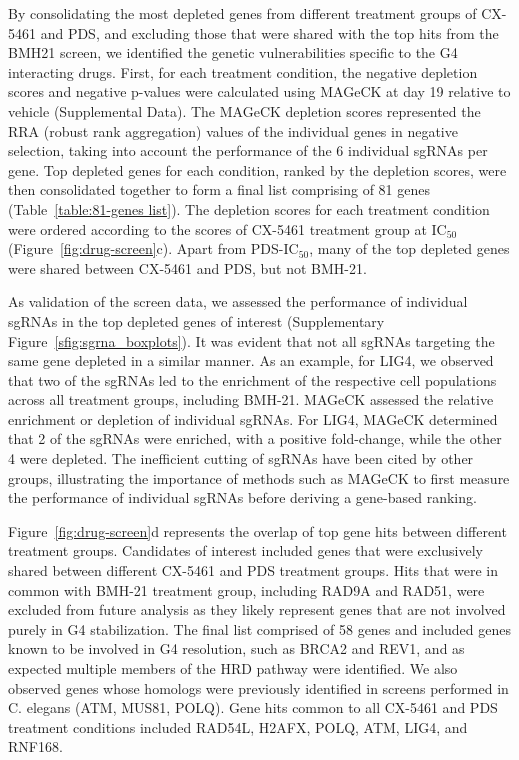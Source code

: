 By consolidating the most depleted genes from different treatment groups of CX-5461 and PDS, and excluding those that were shared with the top hits from the BMH21 screen, we identified the genetic vulnerabilities specific to the G4 interacting drugs. 
First, for each treatment condition, the negative depletion scores and negative p-values were calculated using MAGeCK at day 19 relative to vehicle (Supplemental Data). 
The MAGeCK depletion scores represented the RRA (robust rank aggregation) values of the individual genes in negative selection, taking into account the performance of the 6 individual sgRNAs per gene. 
Top depleted genes for each condition, ranked by the depletion scores, were then consolidated together to form a final list comprising of 81 genes (Table~\ref{table:81-genes list}). 
The depletion scores for each treatment condition were ordered according to the scores of CX-5461 treatment group at IC$_{50}$ (Figure~\ref{fig:drug-screen}c). 
Apart from PDS-IC$_{50}$, many of the top depleted genes were shared between CX-5461 and PDS, but not BMH-21. 

As validation of the screen data, we assessed the performance of individual sgRNAs in the top depleted genes of interest (Supplementary Figure~\ref{sfig:sgrna_boxplots}). 
It was evident that not all sgRNAs targeting the same gene depleted in a similar manner. 
As an example, for LIG4, we observed that two of the sgRNAs led to the enrichment of the respective cell populations across all treatment groups, including BMH-21. MAGeCK assessed the relative enrichment or depletion of individual sgRNAs. 
For LIG4, MAGeCK determined that 2 of the sgRNAs were enriched, with a positive fold-change, while the other 4 were depleted. 
The inefficient cutting of sgRNAs have been cited by other groups\cite{Doench2014,Doench2018}, illustrating the importance of methods such as MAGeCK to first measure the performance of individual sgRNAs before deriving a gene-based ranking.

Figure~\ref{fig:drug-screen}d represents the overlap of top gene hits between different treatment groups. 
Candidates of interest included genes that were exclusively shared between different CX-5461 and PDS treatment groups. 
Hits that were in common with BMH-21 treatment group, including RAD9A and RAD51, were excluded from future analysis as they likely represent genes that are not involved purely in G4 stabilization. 
The final list comprised of 58 genes and included genes known to be involved in G4 resolution, such as BRCA2 and REV1, and as expected multiple members of the HRD pathway were identified. 
We also observed genes whose homologs were previously identified in screens performed in C. elegans (ATM, MUS81, POLQ)\cite{Xu2017}. Gene hits common to all CX-5461 and PDS treatment conditions included RAD54L, H2AFX, POLQ, ATM, LIG4, and RNF168.


